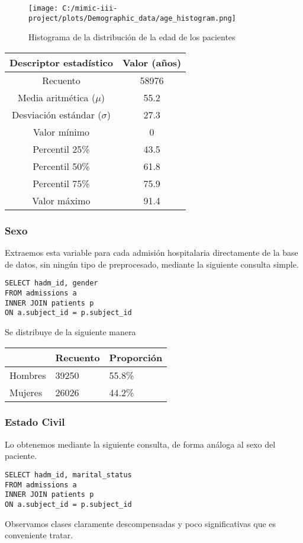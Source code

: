 \documentclass{report}
\begin{document}
\begin{figure}[h]
\centering
\texttt{[image: C:/mimic-iii-project/plots/Demographic\_data/age\_histogram.png]}
\caption{Histograma de la distribución de la edad de los pacientes}
\end{figure}

\begin{longtable}[]{@{}cc@{}}
\toprule
Descriptor estadístico & Valor (años)\tabularnewline
\midrule
\endhead
Recuento & 58976\tabularnewline
Media aritmética ($\mu$) & 55.2\tabularnewline
Desviación estándar ($\sigma$) & 27.3\tabularnewline
Valor mínimo & 0\tabularnewline
Percentil 25\% & 43.5\tabularnewline
Percentil 50\% & 61.8\tabularnewline
Percentil 75\% & 75.9\tabularnewline
Valor máximo & 91.4\tabularnewline
\bottomrule
\end{longtable}

\subsubsection{Sexo}

Extraemos esta variable para cada admisión hospitalaria directamente de la base de datos, sin ningún tipo de preprocesado, mediante la siguiente consulta simple. 
\begin{verbatim}
SELECT hadm_id, gender
FROM admissions a
INNER JOIN patients p
ON a.subject_id = p.subject_id
\end{verbatim}

Se distribuye de la siguiente manera

\begin{longtable}[]{@{}lll@{}}
\toprule
 & Recuento & Proporción\tabularnewline
\midrule
\endhead
Hombres & 39250 & 55.8\% \tabularnewline
Mujeres & 26026 & 44.2\% \tabularnewline
\bottomrule
\end{longtable}

\subsubsection{Estado Civil}

Lo obtenemos mediante la siguiente consulta, de forma análoga al sexo del paciente.

\begin{verbatim}
SELECT hadm_id, marital_status
FROM admissions a
INNER JOIN patients p
ON a.subject_id = p.subject_id
\end{verbatim}
Observamos clases claramente descompensadas y poco significativas que es conveniente tratar. 
\end{document}
